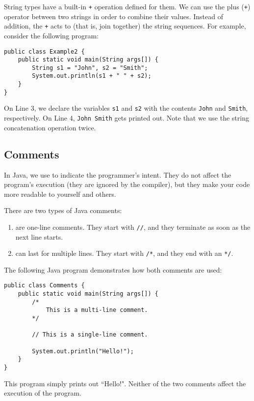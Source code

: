 String types have a built-in \verb!+! operation defined for them. We can use the plus (\verb!+!) operator between two strings in order to combine their values. Instead of addition, the \verb!+! acts to  (that is, join together) the string sequences. For example, consider the following program:

\begin{lstlisting}
public class Example2 {
    public static void main(String args[]) {
        String s1 = "John", s2 = "Smith";
        System.out.println(s1 + " " + s2);
    }
}
\end{lstlisting}

On Line $3$, we declare the variables \verb!s1! and \verb!s2! with the contents \verb!John! and \verb!Smith!, respectively. On Line $4$, \verb!John Smith! gets printed out. Note that we use the string concatenation operation twice. 

\subsection{Comments}

In Java, we use  to indicate the programmer's intent. They do not affect the program's execution (they are ignored by the compiler), but they make your code more readable to yourself and others. 

There are two types of Java comments:


\begin{enumerate}
    \item {} are one-line comments. They start with \verb!//!, and they terminate as soon as the next line starts. 
    \item {} can last for multiple lines. They start with \verb!/*!, and they end with an \verb!*/!. 
\end{enumerate}

The following Java program demonstrates how both comments are used:

\begin{lstlisting}
public class Comments {
    public static void main(String args[]) {
        /*
            This is a multi-line comment. 
        */
        
        // This is a single-line comment.
        
        System.out.println("Hello!");
    }
}
\end{lstlisting}

This program simply prints out ``Hello!". Neither of the two comments affect the execution of the program.


